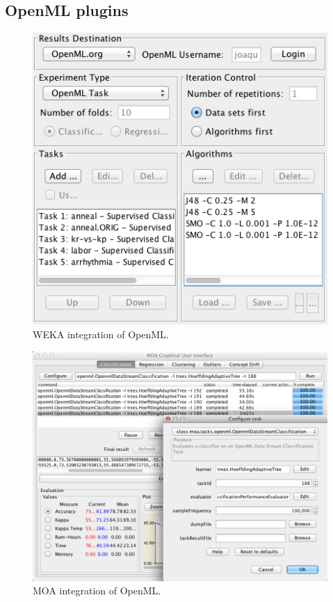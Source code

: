 \documentclass{acmproc-sp}
\begin{document}
\subsection{OpenML plugins}
\label{plugins}
\begin{figure}
\centering
\includegraphics[width=\columnwidth]{openml-weka.png}
\caption{\label{fig:weka}WEKA integration of OpenML.}
\end{figure}

\begin{figure}
\centering
\includegraphics[width=\columnwidth]{openml-moa.png}
\caption{\label{fig:moa}MOA integration of OpenML.}
\end{figure}
\end{document}
